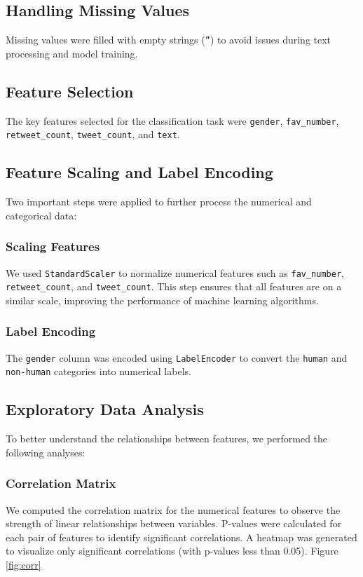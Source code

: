 \documentclass[a4paper,11pt]{article}
\begin{document}
\subsection{Handling Missing Values}
Missing values were filled with empty strings (\texttt{''}) to avoid issues during text processing and model training.

\subsection{Feature Selection}
The key features selected for the classification task were \texttt{gender}, \texttt{fav\_number}, \texttt{retweet\_count}, \texttt{tweet\_count}, and \texttt{text}.

\subsection{Feature Scaling and Label Encoding}
Two important steps were applied to further process the numerical and categorical data:

\subsubsection{Scaling Features}
We used \texttt{StandardScaler} to normalize numerical features such as \texttt{fav\_number}, \texttt{retweet\_count}, and \texttt{tweet\_count}. This step ensures that all features are on a similar scale, improving the performance of machine learning algorithms.

\subsubsection{Label Encoding}
The \texttt{gender} column was encoded using \texttt{LabelEncoder} to convert the \texttt{human} and \texttt{non-human} categories into numerical labels.

\subsection{Exploratory Data Analysis}
To better understand the relationships between features, we performed the following analyses:

\subsubsection{Correlation Matrix}
We computed the correlation matrix for the numerical features to observe the strength of linear relationships between variables. P-values were calculated for each pair of features to identify significant correlations. A heatmap was generated to visualize only significant correlations (with p-values less than 0.05). Figure \ref{fig:corr}
\end{document}
